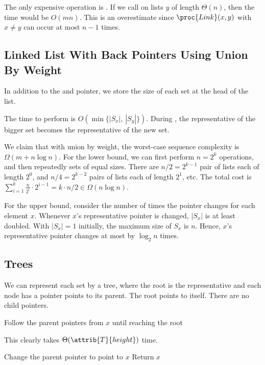 The only expensive operation is . If we call  on lists $y$ of length $\Theta(n)$, then the time would be $O(mn)$. This is an overestimate since $\proc{Link}(x,y)$ with $x \neq y$ can occur at most $n-1$ times.


\subsection{Linked List With Back Pointers Using Union By Weight}

In addition to the  and  pointer, we store the size of each set at the head of the list.

The time to perform  is $O(\min \{ |S_x|,\, |S_y|\})$. During , the representative of the bigger set becomes the representative of the new set.

We claim that with union by weight, the worst-case sequence complexity is $\Omega(m+n \log n)$. For the lower bound, we can first perform $n=2^k$  operations, and then repeatedly  sets of equal sizes. There are $n/2 = 2^{k-1}$ pair of lists each of length $2^0$, and $n/4 = 2^{k-2}$ pairs of lists each of length $2^1$, etc. The total cost is $\sum_{i=1}^k \frac{n}{2^i} \cdot 2^{i-1} = k\cdot n/2 \in \Omega(n \log n)$. 

For the upper bound, consider the number of times the  pointer changes for each element $x$. Whenever $x$'s representative pointer is changed, $|S_x|$ is at least doubled. With $|S_x| = 1$ initially, the maximum size of $S_x$ is $n$. Hence, $x$'s representative pointer changes at most by $\log_2 n$ times.

\subsection{Trees}

We can represent each set by a tree, where the root is the representative and each node has a  pointer points to its parent. The root points to itself. There are no child pointers.

\begin{codebox}
    \zi Follow the parent pointers from $x$ until reaching the root
\end{codebox}

This clearly takes $\Theta(\attrib{T}{height})$ time.

\begin{codebox}
    \zi Change the parent pointer to point to $x$
    \zi Return $x$
\end{codebox}


